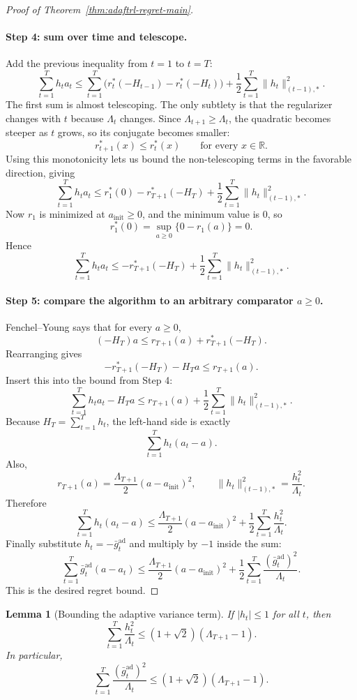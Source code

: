 \documentclass[11pt]{article}
\newtheorem{lemma}{Lemma}
\newcommand{\R}{\mathbb{R}}
\newcommand{\1}{\mathbf{1}}
\begin{document}
\begin{proof}[Proof of Theorem~\ref{thm:adaftrl-regret-main}]
\paragraph{Step 4: sum over time and telescope.}
Add the previous inequality from $t=1$ to $t=T$:
\[
\sum_{t=1}^T h_t a_t
\le
\sum_{t=1}^T\bigl(r_t^*(-H_{t-1})-r_t^*(-H_t)\bigr)
+\frac12\sum_{t=1}^T \|h_t\|_{(t-1),*}^2.
\]
The first sum is almost telescoping. The only subtlety is that the regularizer changes with $t$ because $\Lambda_t$ changes. Since $\Lambda_{t+1}\ge \Lambda_t$, the quadratic becomes steeper as $t$ grows, so its conjugate becomes smaller:
\[
r_{t+1}^*(x)\le r_t^*(x)
\qquad\text{for every }x\in\R.
\]
Using this monotonicity lets us bound the non-telescoping terms in the favorable direction, giving
\[
\sum_{t=1}^T h_t a_t
\le
r_1^*(0)-r_{T+1}^*(-H_T)+\frac12\sum_{t=1}^T \|h_t\|_{(t-1),*}^2.
\]
Now $r_1$ is minimized at $a_{\mathrm{init}}\ge 0$, and the minimum value is $0$, so
\[
r_1^*(0)=\sup_{a\ge 0}\{0-r_1(a)\}=0.
\]
Hence
\[
\sum_{t=1}^T h_t a_t
\le
-r_{T+1}^*(-H_T)+\frac12\sum_{t=1}^T \|h_t\|_{(t-1),*}^2.
\]

\paragraph{Step 5: compare the algorithm to an arbitrary comparator $a\ge 0$.}
Fenchel--Young says that for every $a\ge 0$,
\[
(-H_T)a\le r_{T+1}(a)+r_{T+1}^*(-H_T).
\]
Rearranging gives
\[
-r_{T+1}^*(-H_T)-H_Ta\le r_{T+1}(a).
\]
Insert this into the bound from Step 4:
\[
\sum_{t=1}^T h_t a_t-H_Ta
\le
r_{T+1}(a)+\frac12\sum_{t=1}^T \|h_t\|_{(t-1),*}^2.
\]
Because $H_T=\sum_{t=1}^T h_t$, the left-hand side is exactly
\[
\sum_{t=1}^T h_t(a_t-a).
\]
Also,
\[
r_{T+1}(a)=\frac{\Lambda_{T+1}}{2}(a-a_{\mathrm{init}})^2,
\qquad
\|h_t\|_{(t-1),*}^2=\frac{h_t^2}{\Lambda_t}.
\]
Therefore
\[
\sum_{t=1}^T h_t(a_t-a)
\le
\frac{\Lambda_{T+1}}{2}(a-a_{\mathrm{init}})^2+\frac12\sum_{t=1}^T \frac{h_t^2}{\Lambda_t}.
\]
Finally substitute $h_t=-\bar g_t^{\mathrm{ad}}$ and multiply by $-1$ inside the sum:
\[
\sum_{t=1}^T \bar g_t^{\mathrm{ad}}(a-a_t)
\le
\frac{\Lambda_{T+1}}{2}(a-a_{\mathrm{init}})^2+\frac12\sum_{t=1}^T \frac{(\bar g_t^{\mathrm{ad}})^2}{\Lambda_t}.
\]
This is the desired regret bound.
\end{proof}

\begin{lemma}[Bounding the adaptive variance term]
\label{lem:app-adaptive-sum}
If \( |h_t|\le 1 \) for all \(t\), then
\[
\sum_{t=1}^T \frac{h_t^2}{\Lambda_t} \le (1+\sqrt{2})(\Lambda_{T+1}-1).
\]
In particular,
\[
\sum_{t=1}^T \frac{(\bar g_t^{\mathrm{ad}})^2}{\Lambda_t} \le (1+\sqrt{2})(\Lambda_{T+1}-1).
\]
\end{lemma}
\end{document}

